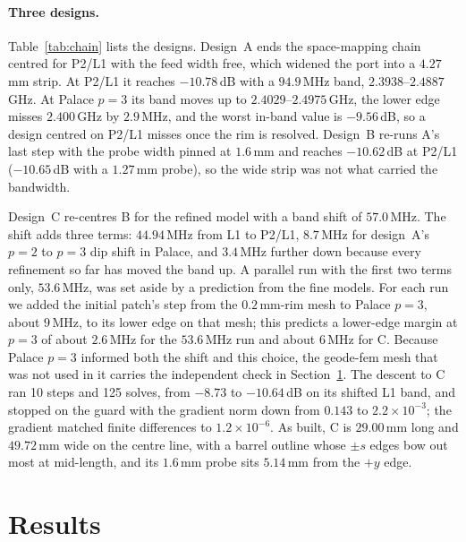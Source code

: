 \documentclass{anvil-paper}
\newcommand{\PL}{P2/L1}
\begin{document}
\paragraph{Three designs.}
Table~\ref{tab:chain} lists the designs. Design~A ends the space-mapping
chain centred for \PL{} with the feed width free, which widened the port
into a $4.27$\,mm strip. At \PL{} it reaches $-10.78$\,dB with a
$94.9$\,MHz band, $2.3938$--$2.4887$\,GHz. At Palace $p = 3$ its band moves
up to $2.4029$--$2.4975$\,GHz, the lower edge misses $2.400$\,GHz by
$2.9$\,MHz, and the worst in-band value is $-9.56$\,dB, so a design centred
on \PL{} misses once the rim is resolved. Design~B re-runs A's last step
with the probe width pinned at $1.6$\,mm and reaches $-10.62$\,dB at \PL{}
($-10.65$\,dB with a $1.27$\,mm probe), so the wide strip was not what
carried the bandwidth.

Design~C re-centres B for the refined model with a band shift of
$57.0$\,MHz. The shift adds three terms: $44.94$\,MHz from L1 to \PL,
$8.7$\,MHz for design~A's $p = 2$ to $p = 3$ dip shift in Palace, and
$3.4$\,MHz further down because every refinement so far has moved the band
up. A parallel run with the first two terms only, $53.6$\,MHz, was set
aside by a prediction from the fine models. For each run we added the
initial patch's step from the $0.2$\,mm-rim mesh to Palace $p = 3$, about
$9$\,MHz, to its lower edge on that mesh; this predicts a lower-edge margin
at $p = 3$ of about $2.6$\,MHz for the $53.6$\,MHz run and about $6$\,MHz for
C. Because Palace $p = 3$ informed both the shift and this choice, the
geode-fem mesh that was not used in it carries the independent check in
Section~\ref{sec:results}. The descent to C ran 10 steps and 125 solves, from
$-8.73$ to $-10.64$\,dB on its shifted L1 band, and stopped on the guard
with the gradient norm down from $0.143$ to $2.2\times10^{-3}$; the gradient
matched finite differences to $1.2\times10^{-6}$. As built, C is
$29.00$\,mm long and $49.72$\,mm wide on the centre line, with a barrel
outline whose $\pm s$ edges bow out most at mid-length, and its $1.6$\,mm
probe sits $5.14$\,mm from the $+y$ edge.

\section{Results}
\label{sec:results}
\end{document}
